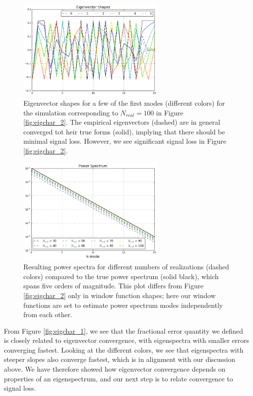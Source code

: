 \begin{figure}
    \centering
	\includegraphics[width=0.65\textwidth]{plots/eigchar_3.png}    
	\caption{Eigenvector shapes for a few of the first modes (different colors) for the simulation corresponding to $N_{real}=100$ in Figure \ref{fig:eigchar_2}. The empirical eigenvectors (dashed) are in general converged tot heir true forms (solid), implying that there should be minimal signal loss. However, we see significant signal loss in Figure \ref{fig:eigchar_2}.}
    \label{fig:eigchar_3}
\end{figure}

\begin{figure}
    \centering
	\includegraphics[width=0.65\textwidth]{plots/eigchar_4.png}    
	\caption{Resulting power spectra for different numbers of realizations (dashed colors) compared to the true power spectrum (solid black), which spans five orders of magnitude. This plot differs from Figure \ref{fig:eigchar_2} only in window function shapes; here our window functions are set to estimate power spectrum modes independently from each other.}
    \label{fig:eigchar_4}
\end{figure}

From Figure \ref{fig:eigchar_1}, we see that the fractional error quantity we defined is closely related to eigenvector convergence, with eigenspectra with smaller errors converging fastest. Looking at the different colors, we see that eigenspectra with steeper slopes also converge fastest, which is in alignment with our discussion above. We have therefore showed how eigenvector convergence depends on properties of an eigenspectrum, and our next step is to relate convergence to signal loss. 

